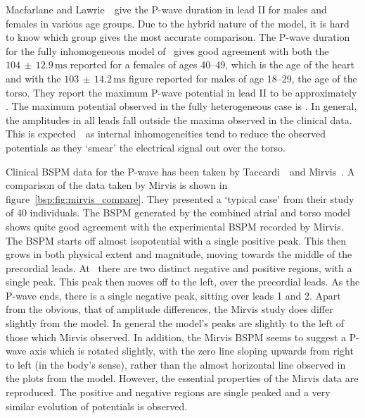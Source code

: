 Macfarlane and Lawrie~\cite{MacFarlane1989b}\ give the P-wave duration in
lead II for males and females in various age groups.
Due to the hybrid nature of the model, it is hard to know which group gives the
most accurate comparison.
The P-wave duration for the fully inhomogeneous model of \ gives good
agreement with both the $104\,\pm\,12.9\,\text{ms}$ reported for a females of
ages 40--49, which is the age of the heart and with the
$103\,\pm\,14.2\,\text{ms}$ figure reported for males of age 18--29, the age of
the torso.
They report the maximum P-wave potential in lead II to be approximately
.
The maximum potential observed in the fully heterogeneous case is .
In general, the amplitudes in all leads fall outside the maxima observed in the
clinical data.
This is expected~\cite{Ramanathan2001a,Gulrajani1983,Gulrajani1989,Klepfer1997}\ as internal
inhomogeneities tend to reduce the observed potentials as they `smear' the
electrical signal out over the torso.

Clinical BSPM data for the P-wave has been taken by
Taccardi~\cite{Taccardi1966}\ and Mirvis~\cite{Mirvis1980}.
A comparison of the data taken by Mirvis is shown in
figure~\ref{bsp:fig:mirvis_compare}.
They presented a `typical case' from their study of 40 individuals.
The BSPM generated by the combined atrial and torso model shows quite good
agreement with the experimental BSPM recorded by Mirvis.
The BSPM starts off almost isopotential with a single positive peak.
This then grows in both physical extent and magnitude, moving towards the middle
of the precordial leads.
At \ there are two distinct negative and positive regions, with a single
peak.
This peak then moves off to the left, over the precordial leads.
As the P-wave ends, there is a single negative peak, sitting over leads 1 and 2.
Apart from the obvious, that of amplitude differences, the Mirvis study does
differ slightly from the model.
In general the model's peaks are slightly to the left of those which Mirvis
observed.
In addition, the Mirvis BSPM seems to suggest a P-wave axis which is rotated
slightly, with the zero line sloping upwards from right to left (in the body's
sense), rather than the almost horizontal line observed in the plots from the
model.
However, the essential properties of the Mirvis data are reproduced.
The positive and negative regions are single peaked and a very similar evolution
of potentials is observed.

